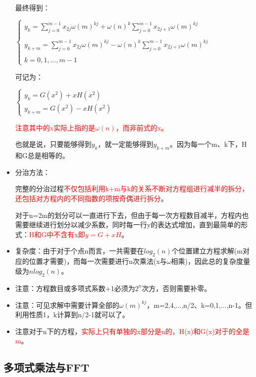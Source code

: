 \documentclass[UTF8]{article}%
\begin{document}
\begin{itemize}
    最终得到：
    
    $\left\{\begin{array}{l}
        y_{k}=\sum_{j=0}^{m-1} x_{2 j} \omega(m)^{k j}+\omega(n)^{k} \sum_{j=0}^{m-1} x_{2 j+1} \omega(m)^{k j} \\ \\
        y_{k+m}=\sum_{j=0}^{m-1} x_{2 j} \omega(m)^{k j}-\omega(n)^{k} \sum_{j=0}^{m-1} x_{2 j+1} \omega(m)^{k j} \\ \\
        k=0,1, \ldots, m-1
    \end{array}\right.$

    可记为：

    $\left\{\begin{array}{l}
    y_k=G(x^2)+xH(x^2) \\ 
    y_{k+m}=G(x^2)-xH(x^2)
    \end{array}\right.$

    \textcolor{red}{注意其中的x实际上指的是$\omega(n)$，而非前式的x。}
    
    也就是说，只要能够得到$y_k$，就一定能够得到$y_{k+m}$。因为每一个m、k下，H和G总是相等的。

    \item 分治方法：
    
    完整的分治过程\textcolor{red}{不仅包括利用k+m与k的关系不断对方程组进行减半的拆分，还包括对方程内的不同指数的项按奇偶进行拆分}。
    
    对于n=2m的划分可以一直进行下去，但由于每一次方程数目减半，方程内也需要继续进行划分以减少系数，同时每一行y的表达式增加，直到最简单的形式：\textcolor{red}{H和G中不含有x即$y=G+xH$}。

    \item 复杂度：由于对于个点n而言，一共需要在$log_2(n)$个位置建立方程求解(m对应的位置才需要)，而每一次需要进行n次乘法(x与$\omega$相乘)，因此总的复杂度量级为$nlog_2(n)$。
    \item 注意：方程数目或多项式系数+1必须为$2^n$次方，否则需要补零。
    \item 注意：可见求解中需要计算全部的$\omega(m)^{kj}$，m=2,4,...,n/2、k=0,1,...,n-1。但利用性质1，k计算到n/2-1就可以了。
    \item 注意对于n下的方程，\textcolor{red}{实际上只有单独的x部分是n的，H(x)和G(x)对于的全是m}。
\end{itemize}

\subsection{多项式乘法与FFT}
\end{document}
